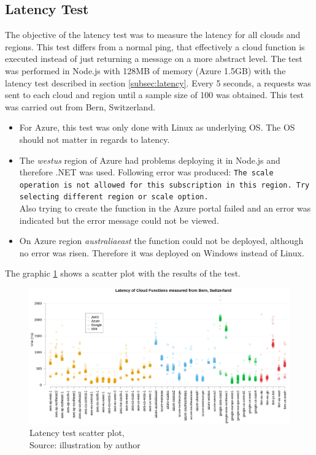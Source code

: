 \subsection{Latency Test}
The objective of the latency test was to measure the latency for all clouds and regions. This test differs from a normal ping, that effectively a cloud function is executed instead of just returning a message on a more abstract level. The test was performed in Node.js with 128\gls{MB} of memory (Azure 1.5\gls{GB}) with the latency test described in section \ref{subsec:latency}. Every 5 seconds, a requests was sent to each cloud and region until a sample size of 100 was obtained. This test was carried out from Bern, Switzerland.
\begin{remarks}
\text{ }
\begin{itemize}
    \item For Azure, this test was only done with Linux as underlying OS. The OS should not matter in regards to latency.
    \item The \textit{westus} region of Azure had problems deploying it in Node.js and therefore .NET was used. Following error was produced: \texttt{The scale operation is not allowed for this subscription in this region. Try selecting different region or scale option.}\\
    Also trying to create the function in the Azure portal failed and an error was indicated but the error message could not be viewed.
    \item On Azure region \textit{australiaeast} the function could not be deployed, although no error was risen. Therefore it was deployed on Windows instead of Linux.
\end{itemize}
\end{remarks}
The graphic \ref{fig:latency_plot} shows a scatter plot with the results of the test.

\begin{figure}[htp]
\begin{center}
\includegraphics[scale=0.335]{bilder/scatterplot_latency.png}
\captionsetup{justification=centering, labelfont=bf}
\caption[Latency test scatter plot]{Latency test scatter plot, \\ Source: illustration by author}
\label{fig:latency_plot}
\end{center}
\end{figure}

